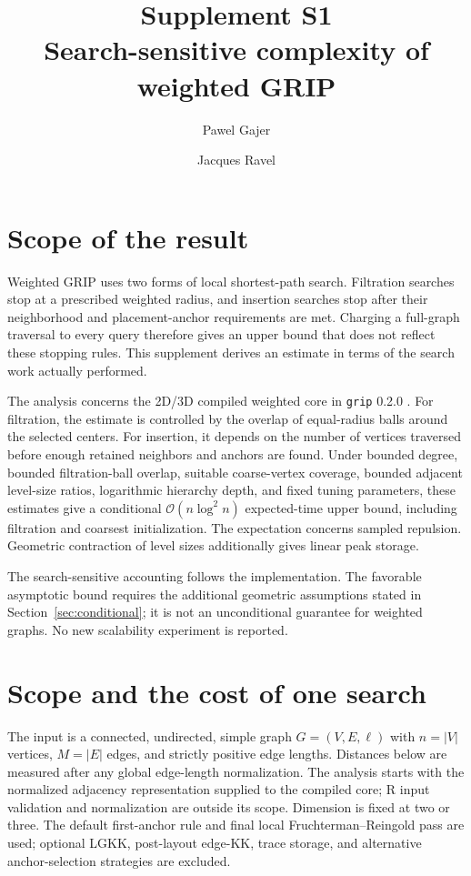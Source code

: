 \documentclass[11pt,a4paper]{article}
\title{Supplement S1\\Search-sensitive complexity of weighted GRIP}
\author{Pawel Gajer \and Jacques Ravel}
\date{}
\newcommand{\bigO}{\mathcal O}
\begin{document}
\maketitle

\section{Scope of the result}

Weighted GRIP uses two forms of local shortest-path search. Filtration
searches stop at a prescribed weighted radius, and insertion searches stop
after their neighborhood and placement-anchor requirements are met. Charging
a full-graph traversal to every query therefore gives an upper bound that
does not reflect these stopping rules. This supplement derives an estimate
in terms of the search work actually performed.

The analysis concerns the 2D/3D compiled weighted core in \texttt{grip} 0.2.0
\citep{gripcode2026}. For filtration, the estimate is controlled by the overlap
of equal-radius balls around the selected centers. For insertion, it depends
on the number of vertices traversed before enough retained neighbors and
anchors are found. Under bounded degree, bounded filtration-ball overlap,
suitable coarse-vertex coverage, bounded adjacent level-size ratios,
logarithmic hierarchy depth, and fixed tuning parameters, these estimates give a conditional
$\bigO(n\log^2 n)$ expected-time upper bound, including filtration and
coarsest initialization. The expectation concerns sampled repulsion.
Geometric contraction of level sizes additionally gives linear peak storage.

The search-sensitive accounting follows the implementation. The favorable
asymptotic bound requires the additional geometric assumptions stated in
Section~\ref{sec:conditional}; it is not an unconditional guarantee for
weighted graphs. No new scalability experiment is reported.

\section{Scope and the cost of one search}

The input is a connected, undirected, simple graph $G=(V,E,\ell)$ with $n=|V|$
vertices, $M=|E|$ edges, and strictly positive edge lengths. Distances below are
measured after any global edge-length normalization. The analysis starts with
the normalized adjacency representation supplied to the compiled core; R input
validation and normalization are outside its scope. Dimension is fixed at two
or three. The default first-anchor rule and final local Fruchterman--Reingold
pass are used; optional LGKK, post-layout edge-KK, trace storage, and alternative
anchor-selection strategies are excluded.
\end{document}
